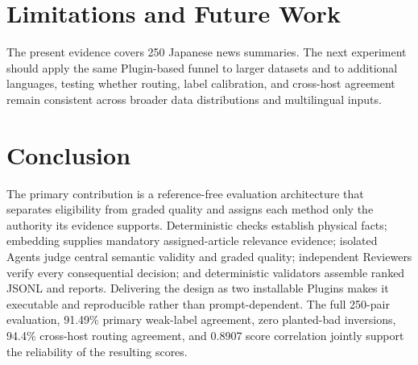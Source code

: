 \documentclass[conference]{IEEEtran}
\begin{document}
\newpage
\balance
\section{Limitations and Future Work}
The present evidence covers 250 Japanese news summaries. The next experiment should apply the same Plugin-based funnel to larger datasets and to additional languages, testing whether routing, label calibration, and cross-host agreement remain consistent across broader data distributions and multilingual inputs.

\section{Conclusion}
The primary contribution is a reference-free evaluation architecture that separates eligibility from graded quality and assigns each method only the authority its evidence supports. Deterministic checks establish physical facts; embedding supplies mandatory assigned-article relevance evidence; isolated Agents judge central semantic validity and graded quality; independent Reviewers verify every consequential decision; and deterministic validators assemble ranked JSONL and reports. Delivering the design as two installable Plugins makes it executable and reproducible rather than prompt-dependent. The full 250-pair evaluation, 91.49\% primary weak-label agreement, zero planted-bad inversions, 94.4\% cross-host routing agreement, and 0.8907 score correlation jointly support the reliability of the resulting scores.
\end{document}

